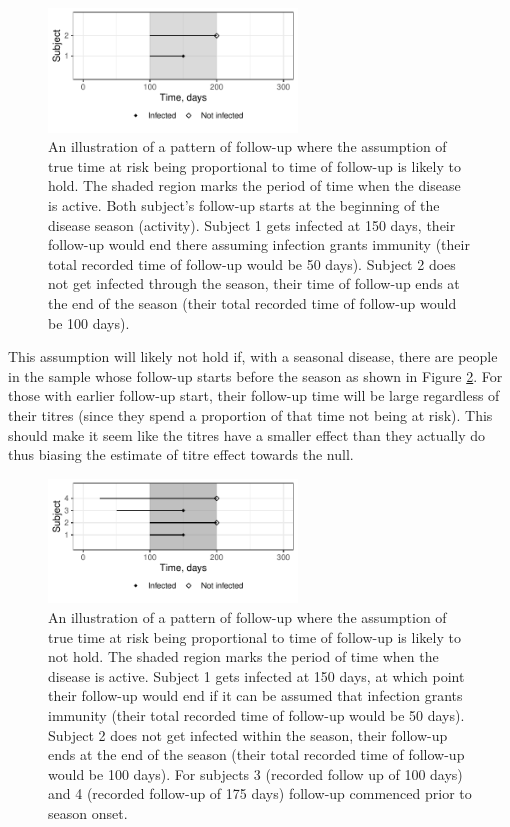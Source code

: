 \begin{figure}[htp]
	\centering
	\includegraphics[width=0.59\textwidth]{../curve-cox/timeplot_3_light.pdf}
	\caption{
	An illustration of a pattern of follow-up where the assumption of true time at risk being proportional to time of follow-up is likely to hold. The shaded region marks the period of time when the disease is active. Both subject's follow-up starts at the beginning of the disease season (activity). Subject 1 gets infected at 150 days, their follow-up would end there assuming infection grants immunity (their total recorded time of follow-up would be 50 days). Subject 2 does not get infected through the season, their time of follow-up ends at the end of the season (their total recorded time of follow-up would be 100 days).
	}
	\label{CoxIdeal}
\end{figure}

This assumption will likely not hold if, with a seasonal disease, there are people in the sample whose follow-up starts before the season as shown in Figure \ref{CoxNotIdeal}. For those with earlier follow-up start, their follow-up time will be large regardless of their titres (since they spend a proportion of that time not being at risk). This should make it seem like the titres have a smaller effect than they actually do thus biasing the estimate of titre effect towards the null.

\begin{figure}[htp]
	\centering
	\includegraphics[width=0.59\textwidth]{../curve-cox/timeplot_4_light.pdf}
	\caption{
	An illustration of a pattern of follow-up where the assumption of true time at risk being proportional to time of follow-up is likely to not hold. The shaded region marks the period of time when the disease is active. Subject 1 gets infected at 150 days, at which point their follow-up would end if it can be assumed that infection grants immunity (their total recorded time of follow-up would be 50 days). Subject 2 does not get infected within the season, their follow-up ends at the end of the season (their total recorded time of follow-up would be 100 days). For subjects 3 (recorded follow up of 100 days) and 4 (recorded follow-up of 175 days) follow-up commenced prior to season onset.
	}
	\label{CoxNotIdeal}
\end{figure}

